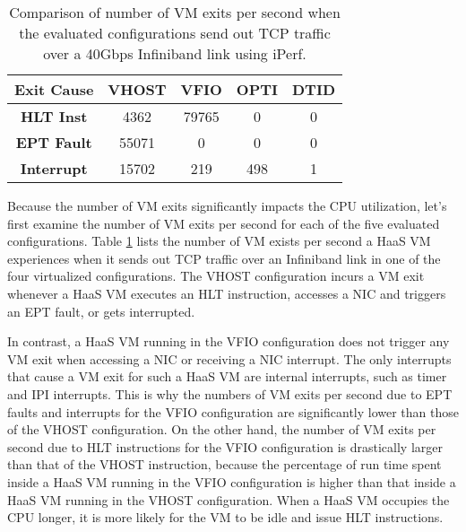 \begin{table}
\renewcommand{\arraystretch}{1.2}
\small
\begin{center}
\begin{tabular}{|c|c|c|c|c|} \hline
{\bf Exit Cause} & {\bf VHOST } & {\bf VFIO} & {\bf OPTI} & {\bf DTID} \\ \hline
 {\bf HLT Inst}    & 4362  & 79765 & 0    & 0    \\ \hline
 {\bf EPT Fault}  & 55071 & 0     & 0    & 0    \\ \hline
{\bf Interrupt}   & 15702 & 219   & 498  & 1    \\ \hline
\end{tabular}
\end{center}
\vspace{-0.1in}
\caption{Comparison of number of VM exits per second when the evaluated 
configurations send out TCP traffic over a
40Gbps Infiniband link using iPerf.}
\label{tab:vm_exit}
\vspace{-0.1in}
\end{table}

Because the number of VM exits significantly impacts the CPU utilization, 
let's first examine the number of VM exits per second for each of the five 
evaluated configurations. 
Table \ref{tab:vm_exit}  lists the number of VM exists per second a HaaS VM experiences 
when it sends out TCP traffic over an Infiniband link in one of the four virtualized 
configurations. 
The VHOST configuration incurs a VM exit whenever a HaaS VM executes an HLT instruction,
accesses a NIC and triggers an EPT fault, or gets interrupted. 

In contrast, a HaaS VM running in the VFIO configuration does not trigger any VM exit when
accessing a NIC or receiving a NIC interrupt.
The only interrupts that cause a VM exit for such a HaaS VM are internal interrupts, such
as timer and IPI interrupts.
This is why the numbers of VM exits per second due to EPT faults and interrupts  for the VFIO 
configuration are significantly lower than those of the VHOST configuration.
On the other hand, the number of VM exits per second due to HLT instructions for the VFIO configuration
is drastically larger than that of the VHOST instruction, because 
the percentage of run time spent inside a HaaS VM running in the VFIO configuration 
is higher than that inside a HaaS VM running in the VHOST configuration.
When a HaaS VM occupies the CPU longer, it is more likely for the VM to be idle and issue HLT instructions.

